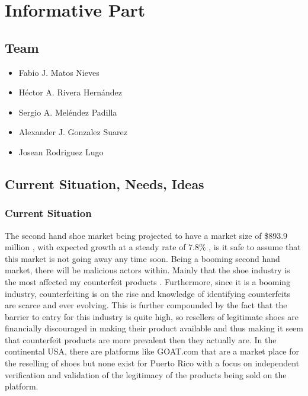 \chapter{Informative Part}
\section{Team}
\begin{itemize}
    \item Fabio J. Matos Nieves
    \item Héctor A. Rivera Hernández
    \item Sergio A. Meléndez Padilla
    \item Alexander J. Gonzalez Suarez
    \item Josean Rodriguez Lugo
\end{itemize}
\section{Current Situation, Needs, Ideas}
\subsection{Current Situation}
\hspace{1cm} The second hand shoe market being projected to have a market size of \$893.9 million \cite{SecondHandDesigner}, with expected growth at a steady rate of 7.8\% \cite{SecondHandDesigner2022}, is it safe to assume that this market is not going away any time soon. Being a booming second hand market, there will be malicious actors within. Mainly that the shoe industry is the most affected my counterfeit products \cite{InfographicIndustriesMost2019}. Furthermore, since it is a booming industry, counterfeiting is on the rise and knowledge of identifying counterfeits are scarce and ever evolving. This is further compounded by the fact that the barrier to entry for this industry is quite high, so resellers of legitimate shoes are financially discouraged in making their product available and thus making it seem that counterfeit products are more prevalent then they actually are. In the continental USA, there are platforms like GOAT.com \cite{GOATCom} that are a market place for the reselling of shoes but none exist for Puerto Rico with a focus on independent verification and validation of the legitimacy of the products being sold on the platform.
